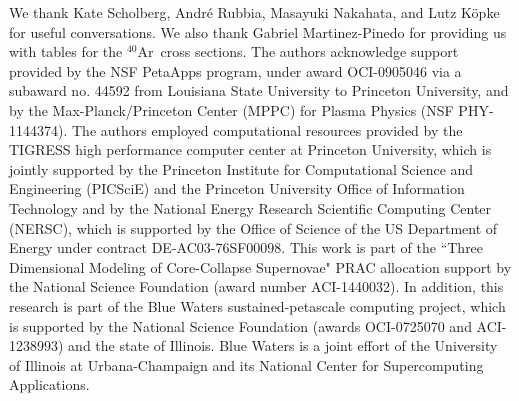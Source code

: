 \documentclass[12pt,preprint]{aastex}
\def\ar40{$^{40}$Ar}
\begin{document}
\acknowledgments

We thank Kate Scholberg, Andr\'e Rubbia, Masayuki Nakahata, and 
Lutz K\"opke
for useful conversations.
We also thank Gabriel Martinez-Pinedo for providing us with tables
for the \ar40\ cross sections.
The authors acknowledge support provided by the NSF PetaApps 
program, under award OCI-0905046 via a subaward no. 44592 from 
Louisiana State University to Princeton University, and by the 
Max-Planck/Princeton Center (MPPC) for Plasma Physics 
(NSF PHY-1144374). The authors employed computational resources 
provided by the TIGRESS high performance computer center at 
Princeton University, which is jointly supported by the Princeton 
Institute for Computational Science and Engineering (PICSciE) and 
the Princeton University Office of Information Technology and by 
the National Energy Research Scientific Computing Center (NERSC), 
which is supported by the Office of Science of the US Department 
of Energy under contract DE-AC03-76SF00098. This work is part of 
the ``Three Dimensional Modeling of Core-Collapse Supernovae" PRAC 
allocation support by the National Science Foundation (award number 
ACI-1440032). In addition, this research is part of the Blue Waters 
sustained-petascale computing project, which is supported by the 
National Science Foundation (awards OCI-0725070 and ACI-1238993) 
and the state of Illinois. Blue Waters is a joint effort of the 
University of Illinois at Urbana-Champaign and its National Center 
for Supercomputing Applications.





\begin{appendix}
\setcounter{table}{0}
\renewcommand{\thetable}{A\arabic{table}}
\renewcommand{\theequation}{A\arabic{equation}}

\end{appendix}


\end{document}

